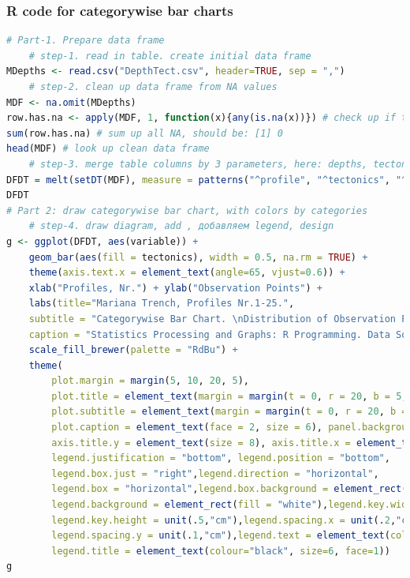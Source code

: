 \documentclass[pdflatex,compress,10pt,
	xcolor={dvipsnames,dvipsnames,svgnames,x11names,table},
	hyperref={colorlinks = true,breaklinks = true, urlcolor = NavyBlue, breaklinks = true}]{beamer}
\begin{document}
\begin{frame}[fragile,shrink=20,]\frametitle{R code for categorywise bar charts}
\begin{lstlisting}[language=R]
# Part-1. Prepare data frame
	# step-1. read in table. create initial data frame
MDepths <- read.csv("DepthTect.csv", header=TRUE, sep = ",")
	# step-2. clean up data frame from NA values
MDF <- na.omit(MDepths) 
row.has.na <- apply(MDF, 1, function(x){any(is.na(x))}) # check up if there is any NA
sum(row.has.na) # sum up all NA, should be: [1] 0
head(MDF) # look up clean data frame 
	# step-3. merge table columns by 3 parameters, here: depths, tectonics, steepness angles. using melt от library(data.table)
DFDT = melt(setDT(MDF), measure = patterns("^profile", "^tectonics", "^tg"), value.name = c("depths", "tectonics", "angles"))
DFDT
# Part 2: draw categorywise bar chart, with colors by categories
	# step-4. draw diagram, add , добавляем legend, design
g <- ggplot(DFDT, aes(variable)) + 
	geom_bar(aes(fill = tectonics), width = 0.5, na.rm = TRUE) +    
	theme(axis.text.x = element_text(angle=65, vjust=0.6)) +  	   
	xlab("Profiles, Nr.") + ylab("Observation Points") + 
	labs(title="Mariana Trench, Profiles Nr.1-25.", 
	subtitle = "Categorywise Bar Chart. \nDistribution of Observation Points across Tectonic Plates: \nMariana, Philippine, Pacific and Caroline",
	caption = "Statistics Processing and Graphs: R Programming. Data Source: QGIS") +
	scale_fill_brewer(palette = "RdBu") +
	theme(
		plot.margin = margin(5, 10, 20, 5),
		plot.title = element_text(margin = margin(t = 0, r = 20, b = 5, l = 0), family = "Kai", face = "bold", size = 12), 
		plot.subtitle = element_text(margin = margin(t = 0, r = 20, b = 4, l = 0), family = "Hei", face = "bold", size = 10), 
		plot.caption = element_text(face = 2, size = 6), panel.background=ggplot2::element_rect(fill = "white"),
		axis.title.y = element_text(size = 8), axis.title.x = element_text(size = 8),
		legend.justification = "bottom", legend.position = "bottom",
		legend.box.just = "right",legend.direction = "horizontal",
		legend.box = "horizontal",legend.box.background = element_rect(colour = "honeydew4",size=0.2),
		legend.background = element_rect(fill = "white"),legend.key.width = unit(1,"cm"),
		legend.key.height = unit(.5,"cm"),legend.spacing.x = unit(.2,"cm"),
		legend.spacing.y = unit(.1,"cm"),legend.text = element_text(colour="black", size=6, face=1),
		legend.title = element_text(colour="black", size=6, face=1))
g
\end{lstlisting}
\end{frame}
\end{document}
